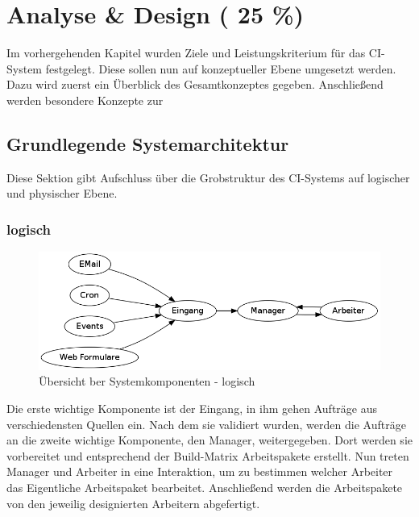 \chapter{Analyse \& Design ( 25 \%)}
\label{chap:design}

Im vorhergehenden Kapitel wurden Ziele und Leistungskriterium
für das CI-System festgelegt.
Diese sollen nun auf konzeptueller Ebene umgesetzt werden.
Dazu wird zuerst ein Überblick des Gesamtkonzeptes gegeben.
Anschließend werden besondere Konzepte zur 


\section{Grundlegende Systemarchitektur}
\label{sec:design:sysarch}
Diese Sektion gibt Aufschluss über die Grobstruktur des CI-Systems auf logischer und physischer Ebene.

\subsection{logisch}

\begin{figure}[ht]
  \centering
  \label{fig:grob-layout-komponenten-logisch}
  \includegraphics[width=\textwidth]{imageinput/grob-layout-komponenten-logisch.png}
  \caption{\"Ubersicht ber Systemkomponenten - logisch}
\end{figure}


Die erste wichtige Komponente ist der Eingang,
in ihm gehen Aufträge aus verschiedensten Quellen ein.
Nach dem sie validiert wurden, werden die Aufträge an
die zweite wichtige Komponente, den Manager, weitergegeben.
Dort werden sie vorbereitet und entsprechend der Build-Matrix Arbeitspakete erstellt.
Nun treten Manager und Arbeiter in eine Interaktion,
um zu bestimmen welcher Arbeiter das Eigentliche Arbeitspaket bearbeitet.
Anschließend werden die Arbeitspakete von den jeweilig designierten Arbeitern abgefertigt.



